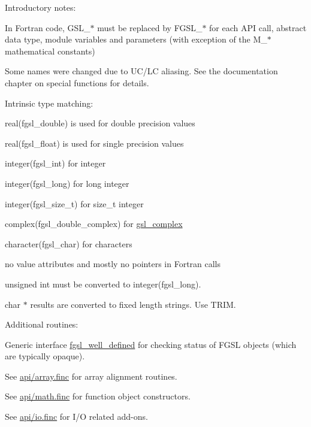 
\begin{DoxyEnumerate}
\item Introductory notes\+: 
\begin{DoxyItemize}
\item In Fortran code, G\+S\+L\+\_\+$\ast$ must be replaced by F\+G\+S\+L\+\_\+$\ast$ for each A\+P\+I call, abstract data type, module variables and parameters (with exception of the M\+\_\+$\ast$ mathematical constants) 
\item Some names were changed due to U\+C/\+L\+C aliasing. See the documentation chapter on special functions for details. 
\item Intrinsic type matching\+:
\begin{DoxyEnumerate}
\item real(fgsl\+\_\+double) is used for double precision values
\item real(fgsl\+\_\+float) is used for single precision values
\item integer(fgsl\+\_\+int) for integer
\item integer(fgsl\+\_\+long) for long integer
\item integer(fgsl\+\_\+size\+\_\+t) for size\+\_\+t integer
\item complex(fgsl\+\_\+double\+\_\+complex) for \hyperlink{structfgsl_1_1gsl__complex}{gsl\+\_\+complex}
\item character(fgsl\+\_\+char) for characters
\item no value attributes and mostly no pointers in Fortran calls
\item unsigned int must be converted to integer(fgsl\+\_\+long).
\item char $\ast$ results are converted to fixed length strings. Use T\+R\+I\+M. 
\end{DoxyEnumerate}
\end{DoxyItemize}
\item Additional routines\+: 
\begin{DoxyItemize}
\item Generic interface \hyperlink{interfacefgsl__well__defined}{fgsl\+\_\+well\+\_\+defined} for checking status of F\+G\+S\+L objects (which are typically opaque). 
\item See \hyperlink{array_8finc}{api/array.\+finc} for array alignment routines. 
\item See \hyperlink{math_8finc}{api/math.\+finc} for function object constructors. 
\item See \hyperlink{io_8finc}{api/io.\+finc} for I/\+O related add-\/ons. 

\end{DoxyItemize}
\end{DoxyEnumerate}
